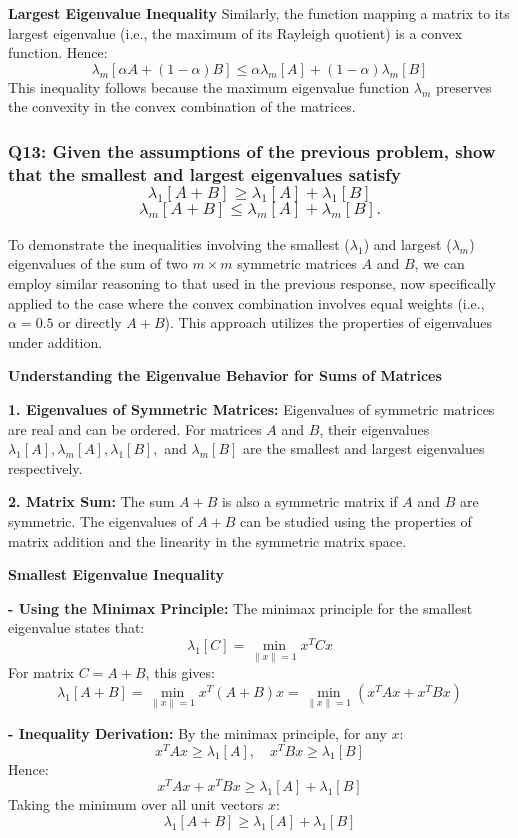 \documentclass[8pt]{article}
\begin{document}
\textbf{Largest Eigenvalue Inequality}
Similarly, the function mapping a matrix to its largest eigenvalue (i.e., the maximum of its Rayleigh quotient) is a convex function. Hence:
\[
\lambda_m[\alpha A + (1 - \alpha) B] \leq \alpha \lambda_m[A] + (1 - \alpha) \lambda_m[B]
\]
This inequality follows because the maximum eigenvalue function \(\lambda_m\) preserves the convexity in the convex combination of the matrices.

\subsubsection*{Q13: Given the assumptions of the previous problem, show that the smallest and largest eigenvalues satisfy
\[
\lambda_1[A + B] \geq \lambda_1[A] + \lambda_1[B]
\]
\[
\lambda_m[A + B] \leq \lambda_m[A] + \lambda_m[B].
\]
}

To demonstrate the inequalities involving the smallest (\(\lambda_1\)) and largest (\(\lambda_m\)) eigenvalues of the sum of two \(m \times m\) symmetric matrices \(A\) and \(B\), we can employ similar reasoning to that used in the previous response, now specifically applied to the case where the convex combination involves equal weights (i.e., \(\alpha = 0.5\) or directly \(A + B\)). This approach utilizes the properties of eigenvalues under addition.

\textbf{Understanding the Eigenvalue Behavior for Sums of Matrices}

\textbf{1. Eigenvalues of Symmetric Matrices:}
   Eigenvalues of symmetric matrices are real and can be ordered. For matrices \(A\) and \(B\), their eigenvalues \(\lambda_1[A], \lambda_m[A], \lambda_1[B],\) and \(\lambda_m[B]\) are the smallest and largest eigenvalues respectively.

\textbf{2. Matrix Sum:}
   The sum \(A + B\) is also a symmetric matrix if \(A\) and \(B\) are symmetric. The eigenvalues of \(A + B\) can be studied using the properties of matrix addition and the linearity in the symmetric matrix space.

\textbf{Smallest Eigenvalue Inequality}

\textbf{- Using the Minimax Principle:}
   The minimax principle for the smallest eigenvalue states that:
   \[
   \lambda_1[C] = \min_{\|x\| = 1} x^T C x
   \]
   For matrix \(C = A + B\), this gives:
   \[
   \lambda_1[A+B] = \min_{\|x\| = 1} x^T (A+B) x = \min_{\|x\| = 1} (x^T A x + x^T B x)
   \]

\textbf{- Inequality Derivation:}
   By the minimax principle, for any \(x\):
   \[
   x^T A x \geq \lambda_1[A], \quad x^T B x \geq \lambda_1[B]
   \]
   Hence:
   \[
   x^T A x + x^T B x \geq \lambda_1[A] + \lambda_1[B]
   \]
   Taking the minimum over all unit vectors \(x\):
   \[
   \lambda_1[A + B] \geq \lambda_1[A] + \lambda_1[B]
   \]
\end{document}
